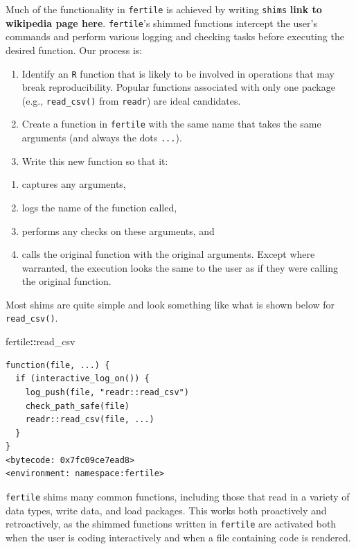 \documentclass[12pt,twoside]{reedthesis}
\newenvironment{Shaded}{\begin{snugshade}}{\end{snugshade}}
\newcommand{\OperatorTok}[1]{\textcolor[rgb]{0.81,0.36,0.00}{\textbf{#1}}}
\newcommand{\NormalTok}[1]{#1}
\providecommand{\tightlist}{%
  \setlength{\itemsep}{0pt}\setlength{\parskip}{0pt}}
\begin{document}
Much of the functionality in \texttt{fertile} is achieved by writing
\texttt{shims} \textbf{link to wikipedia page here}. \texttt{fertile}'s
shimmed functions intercept the user's commands and perform various
logging and checking tasks before executing the desired function. Our
process is:
\begin{enumerate}
\def\labelenumi{\arabic{enumi}.}
\item
  Identify an \texttt{R} function that is likely to be involved in
  operations that may break reproducibility. Popular functions
  associated with only one package (e.g., \texttt{read\_csv()} from
  \texttt{readr}) are ideal candidates.
\item
  Create a function in \texttt{fertile} with the same name that takes
  the same arguments (and always the dots \texttt{...}).
\item
  Write this new function so that it:
\end{enumerate}
\begin{enumerate}
\def\labelenumi{\alph{enumi})}
\tightlist
\item
  captures any arguments,
\item
  logs the name of the function called,
\item
  performs any checks on these arguments, and
\item
  calls the original function with the original arguments. Except where
  warranted, the execution looks the same to the user as if they were
  calling the original function.
\end{enumerate}
Most shims are quite simple and look something like what is shown below
for \texttt{read\_csv()}.

\footnotesize
\begin{Shaded}
\begin{Highlighting}[]
\NormalTok{fertile}\OperatorTok{::}\NormalTok{read_csv}
\end{Highlighting}
\end{Shaded}
\begin{verbatim}
function(file, ...) {
  if (interactive_log_on()) {
    log_push(file, "readr::read_csv")
    check_path_safe(file)
    readr::read_csv(file, ...)
  }
}
<bytecode: 0x7fc09ce7ead8>
<environment: namespace:fertile>
\end{verbatim}
\normalsize

\texttt{fertile} shims many common functions, including those that read
in a variety of data types, write data, and load packages. This works
both proactively and retroactively, as the shimmed functions written in
\texttt{fertile} are activated both when the user is coding
interactively and when a file containing code is rendered.
\end{document}
